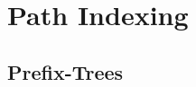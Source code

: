 
\section{Path Indexing}
\subsection{Prefix-Trees}

%	

\begin{frame}
	
\end{frame}

\begin{frame}
	
\end{frame}

